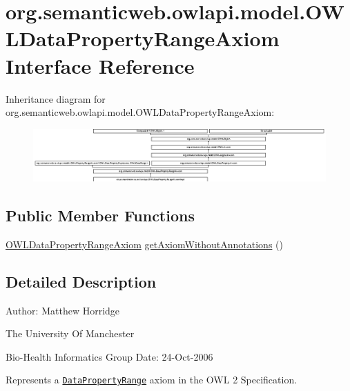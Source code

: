 \hypertarget{interfaceorg_1_1semanticweb_1_1owlapi_1_1model_1_1_o_w_l_data_property_range_axiom}{\section{org.\-semanticweb.\-owlapi.\-model.\-O\-W\-L\-Data\-Property\-Range\-Axiom Interface Reference}
\label{interfaceorg_1_1semanticweb_1_1owlapi_1_1model_1_1_o_w_l_data_property_range_axiom}
}
Inheritance diagram for org.\-semanticweb.\-owlapi.\-model.\-O\-W\-L\-Data\-Property\-Range\-Axiom\-:\begin{figure}[H]
\begin{center}
\leavevmode
\includegraphics[height=2.044862cm]{interfaceorg_1_1semanticweb_1_1owlapi_1_1model_1_1_o_w_l_data_property_range_axiom}
\end{center}
\end{figure}
\subsection*{Public Member Functions}
\begin{DoxyCompactItemize}
\item 
\hyperlink{interfaceorg_1_1semanticweb_1_1owlapi_1_1model_1_1_o_w_l_data_property_range_axiom}{O\-W\-L\-Data\-Property\-Range\-Axiom} \hyperlink{interfaceorg_1_1semanticweb_1_1owlapi_1_1model_1_1_o_w_l_data_property_range_axiom_ae2f088b229c6c899224a3f95557da6a8}{get\-Axiom\-Without\-Annotations} ()
\end{DoxyCompactItemize}


\subsection{Detailed Description}
Author\-: Matthew Horridge\par
 The University Of Manchester\par
 Bio-\/\-Health Informatics Group Date\-: 24-\/\-Oct-\/2006 

Represents a \href{http://www.w3.org/TR/2009/REC-owl2-syntax-20091027/#Data_Property_Range}{\tt Data\-Property\-Range} axiom in the O\-W\-L 2 Specification. 

